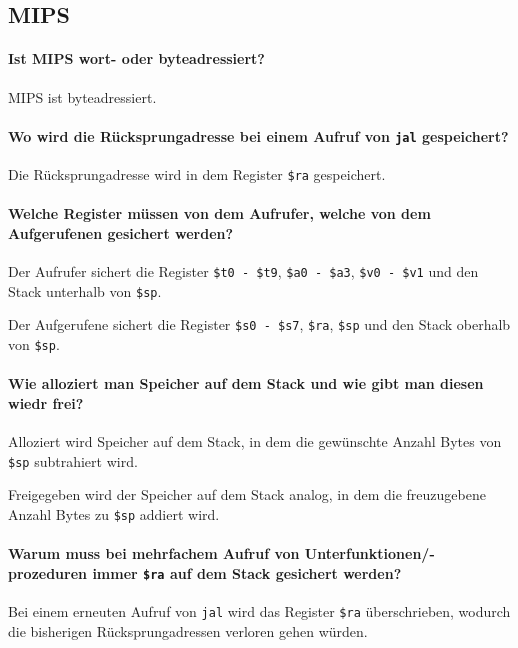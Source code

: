 \documentclass[a4paper, 11pt, accentcolor = tud3b]{tudreport}
\begin{document}
            \subsection{MIPS}
                \paragraph{Ist MIPS wort- oder byteadressiert?}
                    MIPS ist byteadressiert.

                \paragraph{Wo wird die Rücksprungadresse bei einem Aufruf von \texttt{jal} gespeichert?}
                    Die Rücksprungadresse wird in dem Register \texttt{\$ra} gespeichert.

                \paragraph{Welche Register müssen von dem Aufrufer, welche von dem Aufgerufenen gesichert werden?}
                    Der Aufrufer sichert die Register \texttt{\$t0 - \$t9}, \texttt{\$a0 - \$a3}, \texttt{\$v0 - \$v1} und den Stack unterhalb von \texttt{\$sp}.

                    Der Aufgerufene sichert die Register \texttt{\$s0 - \$s7}, \texttt{\$ra}, \texttt{\$sp} und den Stack oberhalb von \texttt{\$sp}.

                \paragraph{Wie alloziert man Speicher auf dem Stack und wie gibt man diesen wiedr frei?}
                    Alloziert wird Speicher auf dem Stack, in dem die gewünschte Anzahl Bytes von \texttt{\$sp} subtrahiert wird.

                    Freigegeben wird der Speicher auf dem Stack analog, in dem die freuzugebene Anzahl Bytes zu \texttt{\$sp} addiert wird.

                \paragraph{Warum muss bei mehrfachem Aufruf von Unterfunktionen/-prozeduren immer \texttt{\$ra} auf dem Stack gesichert werden?}
                    Bei einem erneuten Aufruf von \texttt{jal} wird das Register \texttt{\$ra} überschrieben, wodurch die bisherigen Rücksprungadressen verloren gehen würden.
\end{document}
